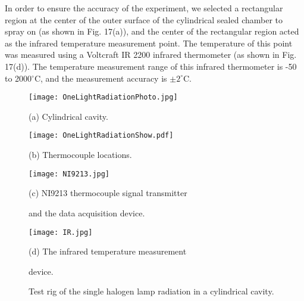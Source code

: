 In order to ensure the accuracy of the experiment, we selected a rectangular region at the center of the outer surface of the cylindrical sealed chamber to spray on (as shown in Fig. 17(a)), and the center of the rectangular region acted as the infrared temperature measurement point.
The temperature of this point was measured using a Voltcraft IR 2200 infrared thermometer (as shown in Fig. 17(d)).
The temperature measurement range of this infrared thermometer is -50 to 2000$^{\circ}$C, and the measurement accuracy is $\pm2^{\circ}$C.

\begin{figure}
  \begin{minipage}[t]{0.5\linewidth} %
  \nonumber
    \centering
    \texttt{[image: OneLightRadiationPhoto.jpg]}
    \centerline{(a) Cylindrical cavity.}
    \label{Fig:OneLightRadiationShow}
  \end{minipage}%
  \begin{minipage}[t]{0.5\linewidth}
    \centering
    \texttt{[image: OneLightRadiationShow.pdf]}
    \centerline{(b) Thermocouple locations.}
    \label{Fig:OneLightRadiationPhoto}
  \end{minipage}

  \begin{minipage}[t]{0.5\linewidth} %
  \nonumber
    \centering
    \texttt{[image: NI9213.jpg]}
    \centerline{(c) NI9213 thermocouple signal transmitter }
    \centerline{and the data acquisition device. }
    \label{Fig:NI9213}
  \end{minipage}%
  \begin{minipage}[t]{0.5\linewidth}
    \centering
    \texttt{[image: IR.jpg]}
    \centerline{(d) The infrared temperature measurement }
    \centerline{device.}
    \label{Fig:IR}
  \end{minipage}


  \caption{Test rig of the single halogen lamp radiation in a cylindrical cavity.}
  \label{Fig:OneLightRadiation}
\end{figure}


